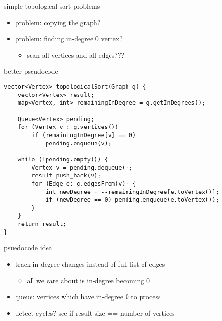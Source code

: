 
\usetikzlibrary{graphs,graphs.standard,graphdrawing,quotes}

\begin{frame}{simple topological sort problems}
\begin{itemize}
\item problem: copying the graph?
\item problem: finding in-degree 0 vertex?
    \begin{itemize}
    \item scan all vertices and all edges???
    \end{itemize}
\end{itemize}
\end{frame}

\begin{frame}[fragile,label=betterTopoSort]{better pseudocode}
\lstset{language=C++,style=smaller}
\begin{lstlisting}
vector<Vertex> topologicalSort(Graph g) {
    vector<Vertex> result;
    map<Vertex, int> remainingInDegree = g.getInDegrees();

    Queue<Vertex> pending;
    for (Vertex v : g.vertices())
        if (remainingInDegree[v] == 0)
            pending.enqueue(v);

    while (!pending.empty()) {
        Vertex v = pending.dequeue();
        result.push_back(v);
        for (Edge e: g.edgesFrom(v)) {
            int newDegree = --remainingInDegree[e.toVertex()];
            if (newDegree == 0) pending.enqueue(e.toVertex());
        }
    }
    return result;
}
\end{lstlisting}
\end{frame}

\begin{frame}{psuedocode idea}
\begin{itemize}
\item track in-degree changes instead of full list of edges
    \begin{itemize}
    \item all we care about is in-degree becoming 0
    \end{itemize}
\item queue: vertices which have in-degree 0 to process
\item detect cycles? see if result size == number of vertices
\end{itemize}
\end{frame}

